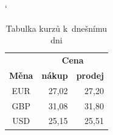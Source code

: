 \documentclass[11pt, titlepage, a4paper]{article}
\begin{document}
		  \bigskip
		  \begin{table}[h]
		  \begin{center}
		  \catcode`
		  \begin{tabular}{|c|r|r|} \hline
        & \multicolumn{2}{|c|}{\textbf{Cena}}\\\cline{2-3}
        \textbf{Měna} & \textbf{nákup} & \textbf{prodej}\\ \hline
      	EUR & 27,02 & 27,20\\
     		GBP & 31,08 & 31,80\\
   		  USD & 25,15 & 25,51\\ \hline
		  \end{tabular}
		  \caption{Tabulka kurzů k~dnešnímu dni}
		  \label{tab:mena}
		  \end{center}
		  \end{table}
\end{document}
